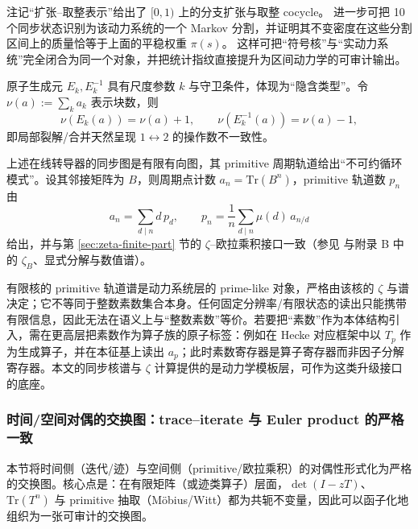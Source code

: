 \begin{remark}
注记“扩张--取整表示”给出了 $[0,1)$ 上的分支扩张与取整 cocycle。
进一步可把 10 个同步状态识别为该动力系统的一个 Markov 分割，并证明其不变密度在这些分割区间上的质量恰等于上面的平稳权重 $\pi(s)$。
这样可把“符号核”与“实动力系统”完全闭合为同一个对象，并把统计指纹直接提升为区间动力学的可审计输出。
\end{remark}

\begin{remark}[操作数不一致与隐含属性]
原子生成元 $E_k,E_k^{-1}$ 具有尺度参数 $k$ 与守卫条件，体现为“隐含类型”。令 $\nu(a):=\sum_k a_k$ 表示块数，则
\[
\nu(E_k(a))=\nu(a)+1,\qquad \nu(E_k^{-1}(a))=\nu(a)-1,
\]
即局部裂解/合并天然呈现 $1\leftrightarrow 2$ 的操作数不一致性。
\end{remark}

\begin{remark}\label{rem:primitive-shadow}
上述在线转导器的同步图是有限有向图，其 primitive 周期轨道给出“不可约循环模式”。设其邻接矩阵为 $B$，则周期点计数 $a_n=\mathrm{Tr}(B^n)$，primitive 轨道数 $p_n$ 由
\[
a_n=\sum_{d\mid n} d\,p_d,\qquad
p_n=\frac{1}{n}\sum_{d\mid n}\mu(d)\,a_{n/d}
\]
给出，并与第 \ref{sec:zeta-finite-part} 节的 $\zeta$--欧拉乘积接口一致（参见 \cite{LindMarcus1995} 与附录 B 中的 $\zeta_B$、显式分解与数值谱）。
\end{remark}

\begin{remark}[素数影子与算术素数的层级差异]\label{rem:prime-shadow-vs-primes}
有限核的 primitive 轨道谱是动力系统层的 prime-like 对象，严格由该核的 $\zeta$ 与谱决定；它不等同于整数素数集合本身。任何固定分辨率/有限状态的读出只能携带有限信息，因此无法在语义上与“整数素数”等价。若要把“素数”作为本体结构引入，需在更高层把素数作为算子族的原子标签：例如在 Hecke 对应框架中以 $T_p$ 作为生成算子，并在本征基上读出 $a_p$；此时素数寄存器是算子寄存器而非因子分解寄存器。本文的同步核谱与 $\zeta$ 计算提供的是动力学模板层，可作为这类升级接口的底座。
\end{remark}

\subsubsection{时间/空间对偶的交换图：trace--iterate 与 Euler product 的严格一致}\label{subsec:time-space-commuting-diagram}
本节将时间侧（迭代/迹）与空间侧（primitive/欧拉乘积）的对偶性形式化为严格的交换图。核心点是：在有限矩阵（或迹类算子）层面，$\det(I-zT)$、$\mathrm{Tr}(T^n)$ 与 primitive 抽取（Möbius/Witt）都为共轭不变量，因此可以函子化地组织为一张可审计的交换图。

